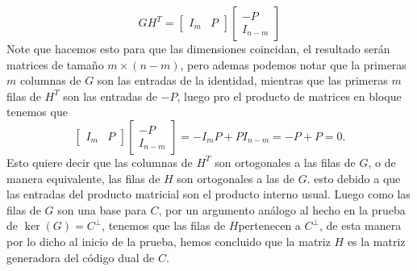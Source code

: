 \begin{sproof}
     $$GH^T=[\begin{array}{c|c}
         I_m& P
     \end{array}]\left[\begin{array}{c}
         -P\\
         \hline 
         I_{n-m}
     \end{array}\right]$$
     Note que hacemos esto para que las dimensiones coincidan, el resultado serán matrices de tamaño $m\times(n-m)$, pero ademas podemos notar que la primeras $m$ columnas de $G$ son las entradas de la identidad, mientras que las primeras $m$ filas de $H^T$ son las entradas de $-P$, luego pro el producto de matrices en bloque tenemos que
     $$[\begin{array}{c|c}
         I_m& P
     \end{array}]\left[\begin{array}{c}
         -P\\
         \hline 
         I_{n-m}
     \end{array}\right]=-I_mP+PI_{n-m}=-P+P=0.$$
     Esto quiere decir que las columnas de $H^T$ son ortogonales a las filas de $G$, o de manera equivalente, las filas de $H$ son ortogonales a las de $G$. esto debido a que las entradas del producto matricial son el producto interno usual. Luego como las filas de $G$ son una base para $C$, por un argumento análogo al hecho en la prueba de $\ker(G)=C^\perp$, tenemos que las filas de $H$pertenecen a $C^\perp$, de esta manera por lo dicho al inicio de la prueba, hemos concluido que la matriz $H$ es la matriz generadora del código dual de $C.$

\end{sproof}